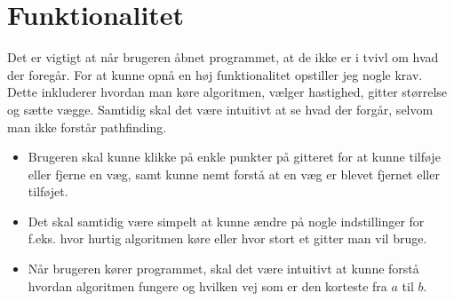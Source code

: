 \documentclass[12pt]{article}
\begin{document}
\section{Funktionalitet}
Det er vigtigt at når brugeren åbnet programmet, at de ikke er i tvivl om hvad der foregår. For at kunne opnå en høj funktionalitet opstiller jeg nogle krav. Dette inkluderer hvordan man køre algoritmen, vælger hastighed, gitter størrelse og sætte vægge. Samtidig skal det være intuitivt at se hvad der forgår, selvom man ikke forstår pathfinding. 
\begin{itemize}
  \item Brugeren skal kunne klikke på enkle punkter på gitteret for at kunne tilføje eller fjerne en væg, samt kunne nemt forstå at en væg er blevet fjernet eller tilføjet. 
  \item Det skal samtidig være simpelt at kunne ændre på nogle indstillinger for f.eks. hvor hurtig algoritmen køre eller hvor stort et gitter man vil bruge. 
  \item Når brugeren kører programmet, skal det være intuitivt at kunne forstå hvordan algoritmen fungere og hvilken vej som er den korteste fra $a$ til $b$.
\end{itemize}
\end{document}
